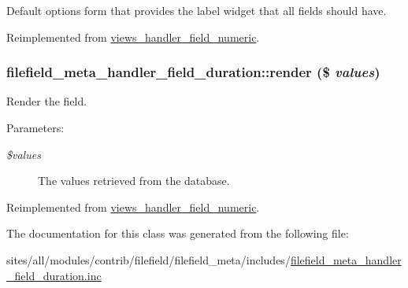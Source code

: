 Default options form that provides the label widget that all fields should have. 

Reimplemented from \hyperlink{classviews__handler__field__numeric_e6f81d1896ece64e9450ebc2d60da2fd}{views\_\-handler\_\-field\_\-numeric}.\hypertarget{classfilefield__meta__handler__field__duration_f511f413dd52df372f7dc396efcc08f2}{
\subsubsection[{render}]{\setlength{\rightskip}{0pt plus 5cm}filefield\_\-meta\_\-handler\_\-field\_\-duration::render (\$ {\em values})}}
\label{classfilefield__meta__handler__field__duration_f511f413dd52df372f7dc396efcc08f2}


Render the field.

\begin{Desc}
\item[Parameters:]
\begin{description}
\item[{\em \$values}]The values retrieved from the database. \end{description}
\end{Desc}


Reimplemented from \hyperlink{classviews__handler__field__numeric_9c76aeef951c45385fd91a22e5e656aa}{views\_\-handler\_\-field\_\-numeric}.

The documentation for this class was generated from the following file:\begin{CompactItemize}
\item 
sites/all/modules/contrib/filefield/filefield\_\-meta/includes/\hyperlink{filefield__meta__handler__field__duration_8inc}{filefield\_\-meta\_\-handler\_\-field\_\-duration.inc}\end{CompactItemize}
